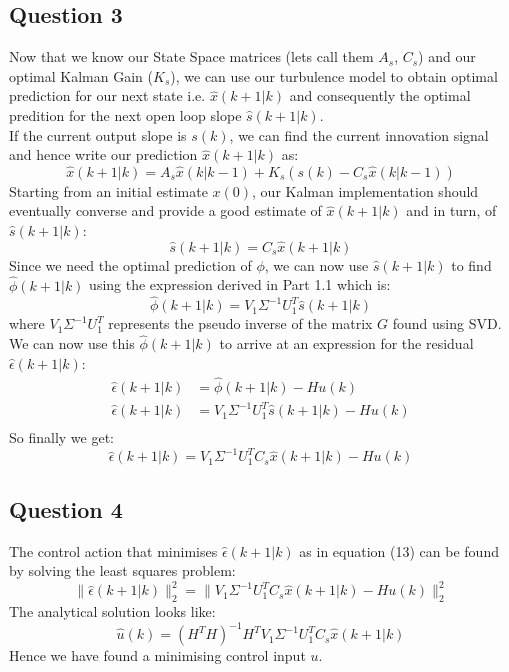 \documentclass[12pt]{report}
\begin{document}
\subsection*{Question 3}
Now that we know our State Space matrices (lets call them $A_s$, $C_s$) and our optimal Kalman Gain ($K_s$), we can use our turbulence model to obtain optimal prediction for our next state i.e. $\hat{x}(k+1|k)$ and consequently the optimal predition for the next open loop slope $\hat{s}(k+1|k)$.\\
If the current output slope is $s(k)$, we can find the current innovation signal and hence write our prediction $\hat{x}(k+1|k)$ as:
\begin{equation}
\hat{x}(k+1|k) = A_s\hat{x}(k|k-1) + K_s(s(k) - C_s\hat{x}(k|k-1))
\end{equation}
Starting from an initial estimate $x(0)$, our Kalman implementation should eventually converse and provide a good estimate of $\hat{x}(k+1|k)$ and in turn, of $\hat{s}(k+1|k)$:
\begin{equation*}
\hat{s}(k+1|k) = C_s\hat{x}(k+1|k)
\end{equation*}
Since we need the optimal prediction of $\phi$, we can now use $\hat{s}(k+1|k)$ to find $\hat{\phi}(k+1|k)$ using the expression derived in Part 1.1 which is:
\begin{equation*}
\hat{\phi}(k+1|k) = V_{1}\Sigma^{-1}U_{1}^{T}\hat{s}(k+1|k)
\end{equation*}
where $V_{1}\Sigma^{-1}U_{1}^{T}$ represents the pseudo inverse of the matrix $G$ found using SVD.\\
We can now use this $\hat{\phi}(k+1|k)$ to arrive at an expression for the residual $\hat{\epsilon}(k+1|k)$:
\begin{equation*}
\begin{aligned}
\hat{\epsilon}(k+1|k) &= \hat{\phi}(k+1|k) - Hu(k)\\
\hat{\epsilon}(k+1|k) &= V_{1}\Sigma^{-1}U_{1}^{T}\hat{s}(k+1|k) - Hu(k)\\
\end{aligned}
\end{equation*}
So finally we get:
\begin{equation}
\hat{\epsilon}(k+1|k) = V_{1}\Sigma^{-1}U_{1}^{T}C_s\hat{x}(k+1|k) - Hu(k)
\end{equation}
\subsection*{Question 4}
The control action that minimises $\hat{\epsilon}(k+1|k)$ as in equation (13) can be found by solving the least squares problem:\\
\begin{equation*}
\|\hat{\epsilon}(k+1|k)\|^2_2 = \|V_{1}\Sigma^{-1}U_{1}^{T}C_s\hat{x}(k+1|k) - Hu(k)\|^2_2
\end{equation*}
The analytical solution looks like:\\
\begin{equation}
\hat{u}(k) = (H^T H)^{-1}H^TV_{1}\Sigma^{-1}U_{1}^{T}C_s\hat{x}(k+1|k)
\end{equation}
Hence we have found a minimising control input $u$.
\end{document}
